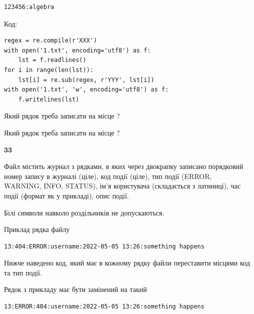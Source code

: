 \begin{verbatim}
123456:algebra
\end{verbatim}




Код:



\begin{verbatim}
regex = re.compile(r'XXX')
with open('1.txt', encoding='utf8') as f:
    lst = f.readlines()
for i in range(len(lst)):
    lst[i] = re.sub(regex, r'YYY', lst[i])
with open('1.txt', 'w', encoding='utf8') as f:
    f.writelines(lst)
\end{verbatim}









Який рядок треба записати на місце  ?\par
\vspace{5mm}


Який рядок треба записати на місце  ?\par


\newpage

{\begin {center}\textbf{ 33}\end {center}}\par
Файл  містить журнал з рядками, в яких через двокрапку записано поряд\-ко\-вий номер запису в журналі (ціле), код події (ціле), тип події (ERROR,\\ WARNING, INFO, STATUS), ім'я користувача (складається з латиниці), час події (фор\-мат як у прикладі), опис події.

Білі символи навколо роздільників не допускаються.

Приклад рядка файлу



\begin{verbatim}
13:404:ERROR:username:2022-05-05 13:26:something happens
\end{verbatim}


Нижче наведено код, який має в кожному рядку файли переставити місцями код та тип події.

Рядок з прикладу має бути замінений на такий



\begin{verbatim}
13:ERROR:404:username:2022-05-05 13:26:something happens
\end{verbatim}




